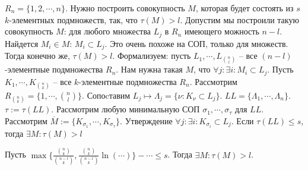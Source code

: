\documentclass[document.tex]{subfiles}
\begin{document}
$R_n = \{1, 2, \cdots, n\}$. Нужно построить совокупность $M$, которая будет состоять из $s$ $k$-элементных подмножеств, так,
что $\tau(M) > l$. Допустим мы построили такую совокупность $M$: для любого множества $L_j$ в $R_n$ имеющего можность $n - l$.
Найдется $M_i \in M$: $M_i \subset L_j$. Это очень похоже на СОП, только для множеств. Тогда конечно же, $\tau(M) > l$.
Формализуем: пусть $L_1, \cdots, L_{\binom{n}{l}}$ -- все $(n - l)$-элементные подмножества $R_n$. Нам нужна такая $M$,
что $\forall j : \exists i: M_i \subset L_j$. Пусть $K_1, \cdots, K_{\binom{n}{k}}$ -- все $k$-элементные подмножества
$R_n$. Рассмотрим $R_{\binom{n}{k}} = \{1, \cdots, \binom{n}{l}\}$. Сопоcтавим $L_j \mapsto \Lambda_j = \{\nu:
    K_{\nu} \subset L_j\}$. $LL = \{\Lambda_1, \cdots, \Lambda_n\}$. $\tau := \tau(LL)$. Рассмотрим любую минимальную
    СОП $\sigma_1, \cdots, \sigma_{\tau}$ для $LL$. Рассмотрим $\overline M := \{K_{\sigma_1}, \cdots,
    K_{\sigma_{\tau}}\}$. Утверждение $\forall j: \exists i: K_{\sigma_i} \subset L_j$. Если $\tau(LL) \leq s$, тогда
    $\exists M: \tau(M) > l$

\begin{theorem}
    Пусть $\max \{ \frac{\binom{n}{k}}{\binom{n - l}{k}}, \frac{\binom{n}{k}}{\binom{n - l}{k}} \ln (\cdots) \} - \cdots
    \leq s$. Тогда $\exists M: \tau(M) > l$.
\end{theorem}
\end{document}
